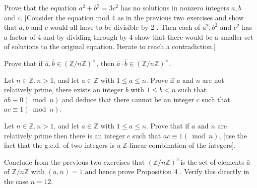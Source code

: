 \begin{questions}
\begin{solution}
    
\end{solution}


\question
    Prove that the equation \(a^2+b^2=3 c^2\) has no solutions in nonzero integers \(a, b\) and \(c\). [Consider the equation mod 4 as in the previous two exercises and show that \(a, b\) and \(c\) would all have to be divisible by 2 . Then each of \(a^2, b^2\) and \(c^2\) has a factor of 4 and by dividing through by 4 show that there would be a smaller set of solutions to the original equation. Iterate to reach a contradiction.]


\begin{solution}
    
\end{solution}


\question
    Prove that if \(\bar{a}, \bar{b} \in(\mathbb{Z} / n \mathbb{Z})^{\times}\), then \(\bar{a} \cdot \bar{b} \in(\mathbb{Z} / n \mathbb{Z})^{\times}\).


\begin{solution}
    
\end{solution}


\question
    Let \(n \in \mathbb{Z}, n>1\), and let \(a \in \mathbb{Z}\) with \(1 \leq a \leq n\). Prove if \(a\) and \(n\) are not relatively prime, there exists an integer \(b\) with \(1 \leq b<n\) such that \(a b \equiv 0(\bmod n)\) and deduce that there cannot be an integer \(c\) such that \(a c \equiv 1(\bmod n)\).


\begin{solution}
    
\end{solution}


\question
    Let \(n \in \mathbb{Z}, n>1\), and let \(a \in \mathbb{Z}\) with \(1 \leq a \leq n\). Prove that if \(a\) and \(n\) are relatively prime then there is an integer \(c\) such that \(a c \equiv 1(\bmod n)\), [use the fact that the g.c.d. of two integers is a \(\mathbb{Z}\)-linear combination of the integers].



\begin{solution}
    
\end{solution}


\question
    Conclude from the previous two exercises that \((\mathbb{Z} / n \mathbb{Z})^{\times}\)is the set of elements \(\bar{a}\) of \(\mathbb{Z} / n \mathbb{Z}\) with \((a, n)=1\) and hence prove Proposition 4 . Verify this directly in the case \(n=12\).




\end{questions}
